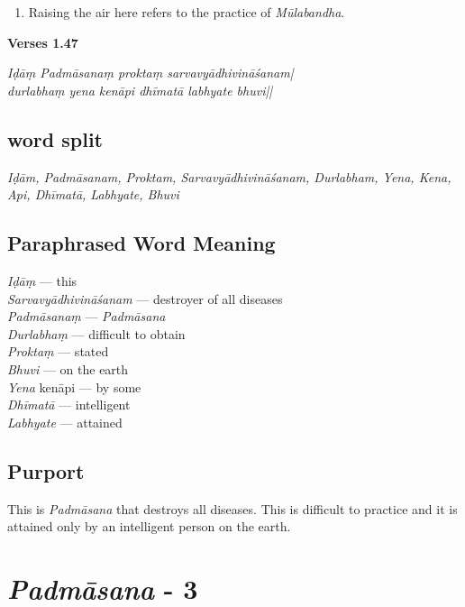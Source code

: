 \begin{enumerate}
\item Raising the air here refers to the practice of \textit{Mūlabandha}.   
\end{enumerate}

\noindent \textbf{Verses 1.47}

\begin{shloka}
\textit{Iḍāṃ Padmāsanaṃ proktaṃ sarvavyādhivināśanam|\\
durlabhaṃ yena kenāpi dhīmatā labhyate bhuvi||}
\end{shloka}

\subsection*{word split}

\textit{Iḍām, Padmāsanam, Proktam, Sarvavyādhivināśanam,  Durlabham, Yena, Kena, Api, Dhīmatā, Labhyate, Bhuvi}

\subsection*{Paraphrased Word Meaning}

\begin{multicols}{2}
\textit{Iḍāṃ} ---  this  \\
\textit{Sarvavyādhivināśanam} --- destroyer of all diseases  \\
\textit{Padmāsanaṃ} ---  \textit{Padmāsana} \\
\textit{Durlabhaṃ} ---  difficult to obtain \\ 
\textit{Proktaṃ} ---  stated  \\
\textit{Bhuvi} --- on the earth  \\
\textit{Yena} kenāpi ---  by some  \\
\textit{Dhīmatā} ---  intelligent  \\
\textit{Labhyate} --- attained
\end{multicols}

\subsection*{Purport}

This is \textit{Padmāsana} that destroys all diseases. This is difficult to practice and it is attained only by an intelligent person on the earth.

\section*{\textit{Padmāsana} - 3}

